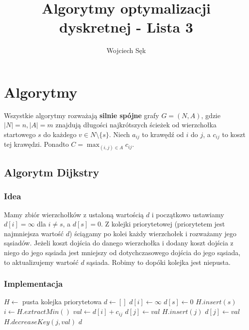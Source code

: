 \documentclass{article}
\title{Algorytmy optymalizacji dyskretnej - Lista 3}
\author{Wojciech Sęk}
\begin{document}
\maketitle
\section{Algorytmy}
Wszystkie algorytmy rozważają \textbf{ silnie spójne} grafy $G=(N,A)$, gdzie $|N|=n,|A|=m$ znajdują długości najkrótszych ścieżek od wierzchołka startowego $s$ do każdego $v\in N\setminus\{s\}$. Niech $a_{ij}$ to krawędź od $i$ do $j$, a $c_{ij}$ to koszt tej krawędzi. Ponadto $\displaystyle C=\max_{(i,j)\in A} c_{ij}$.
\subsection{Algorytm Dijkstry}
\subsubsection{Idea}
Mamy zbiór wierzchołków z ustaloną wartością $d$ i początkowo ustawiamy $d[i]=\infty$ dla $i\neq s$, a $d[s]=0$. Z kolejki priorytetowej (priorytetem jest najmniejsza wartość $d$) ściągamy po kolei każdy wierzchołek i rozważamy jego sąsiadów. Jeżeli koszt dojścia do danego wierzchołka i dodany koszt dojścia z niego do jego sąsiada jest mniejszy od dotychczasowego dojścia do jego sąsiada, to aktualizujemy wartość $d$ sąsiada. Robimy to dopóki kolejka jest niepusta.
\subsubsection{Implementacja}
\begin{algorithmic}
	\State $H \gets$ pusta kolejka priorytetowa
	\State $d \gets []$
		\State $d[i]\gets\infty$
	\EndFor
	\State $d[s] \gets 0$
	\State $H.insert(s)$
		\State $i\gets H.extractMin()$
			\State $val\gets d[i]+c_{ij}$
					\State $d[j]\gets val$
					\State $H.insert(j)$
				\Else
					\State $d[j]\gets val$
					\State $H.decreaseKey(j, val)$
				\EndIf
			\EndIf	
		\EndFor
	\EndWhile	
	\State \Return $d$
\EndFunction
\end{algorithmic}
\newpage
\end{document}
